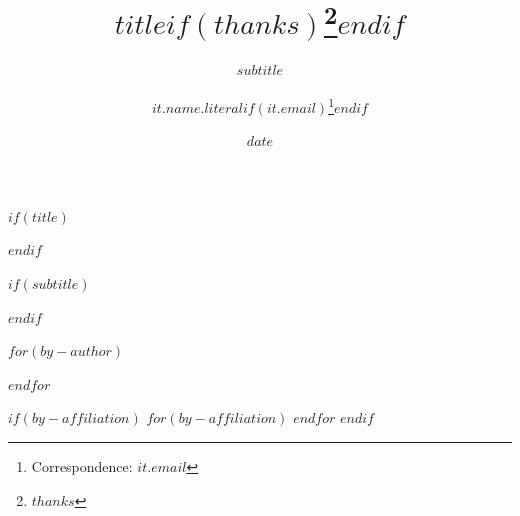 
$if(title)$
\title{$title$$if(thanks)$\thanks{$thanks$}$endif$}
$endif$

$if(subtitle)$
\subtitle{$subtitle$}
$endif$

$for(by-author)$
\author[$for(it.affiliations)$$it.number$$sep$,$endfor$]{$it.name.literal$$if(it.email)$\thanks{Correspondence: $it.email$}$endif$}
$endfor$

$if(by-affiliation)$
$for(by-affiliation)$
$endfor$
$endif$

\date{$date$}
